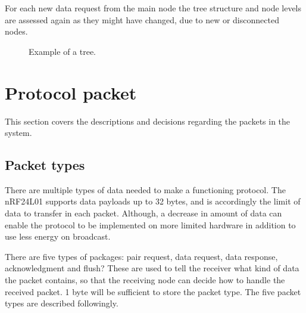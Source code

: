 For each new data request from the main node the tree structure and node levels are assessed again as they might have changed, due to new or disconnected nodes.

\begin{figure}[!h]
	\centering
	\caption{Example of a tree.}
	\label{fig:prottree1}
\end{figure}








\section{Protocol packet}
This section covers the descriptions and decisions regarding the packets in the system.


\subsection{Packet types}
There are multiple types of data needed to make a functioning protocol. The nRF24L01 supports data payloads up to 32 bytes, and is accordingly the limit of data to transfer in each packet.
Although, a decrease in amount of data can enable the protocol to be implemented on more limited hardware in addition to use less energy on broadcast.

There are five types of packages: pair request, data request, data response, acknowledgment and flush?
These are used to tell the receiver what kind of data the packet contains, so that the receiving node can decide how to handle the received packet. 1 byte will be sufficient to store the packet type.
The five packet types are described followingly.

